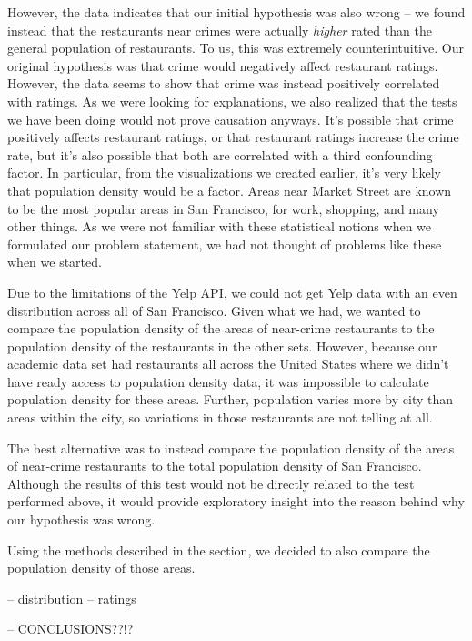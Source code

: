 \documentclass{article}
\begin{document}
However, the data indicates that our initial hypothesis was also wrong --
we found instead that the restaurants near crimes were actually
\textit{higher} rated than the general population of restaurants. To us,
this was extremely counterintuitive. Our original hypothesis was that crime
would negatively affect restaurant ratings. However, the data seems to show
that crime was instead positively correlated with ratings. As we were
looking for explanations, we also realized that the tests we have been
doing would not prove causation anyways. It's possible that crime
positively affects restaurant ratings, or that restaurant ratings increase
the crime rate, but it's also possible that both are correlated with a
third confounding factor. In particular, from the visualizations we created
earlier, it's very likely that population density would be a factor. Areas
near Market Street are known to be the most popular areas in San Francisco,
for work, shopping, and many other things. As we were not familiar with
these statistical notions when we formulated our problem statement, we had
not thought of problems like these when we started.

Due to the limitations of the Yelp API, we could not get Yelp data with an
even distribution across all of San Francisco. Given what we had, we wanted
to compare the population density of the areas of near-crime restaurants to
the population density of the restaurants in the other sets. However,
because our academic data set had restaurants all across the United States
where we didn't have ready access to population density data, it was
impossible to calculate population density for these areas. Further,
population varies more by city than areas within the city, so variations in
those restaurants are not telling at all.

The best alternative was to instead compare the population density of the
areas of near-crime restaurants to the total population density of San
Francisco. Although the results of this test would not be directly related
to the test performed above, it would provide exploratory insight into the
reason behind why our hypothesis was wrong.

Using the methods described in the \textbf{} section,
we decided to also compare the population density of those areas.


-- distribution
-- ratings

-- CONCLUSIONS??!?
\end{document}
